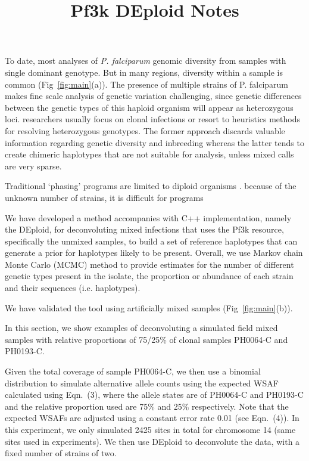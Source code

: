 \documentclass{article}
\title{Pf3k DEploid Notes}
\author{ }
\date{}
\begin{document}
\maketitle

To date, most analyses of {\it P. falciparum} genomic diversity from samples with single dominant genotype.  But in many regions, diversity within a sample is common (Fig~\ref{fig:main}(a)). The presence of multiple strains of P. falciparum makes fine scale
analysis of genetic variation challenging, since genetic differences between
the genetic types of this haploid organism will appear as heterozygous
loci. researchers usually focus on clonal infections or resort
to heuristics methods for resolving heterozygous genotypes. The former
approach discards valuable information regarding genetic diversity and
inbreeding whereas the latter tends to create chimeric haplotypes that are
not suitable for analysis, unless mixed calls are very sparse.


Traditional ‘phasing’ programs are limited to diploid organisms \citep{Browning2007, Howie2009}. because of the unknown number of strains, it is difficult for programs

We have developed a method accompanies with C++ implementation, namely the DEploid, for deconvoluting mixed infections that uses the Pf3k resource, specifically the unmixed samples, to build a set of reference haplotypes that can generate a prior for haplotypes likely to be present. Overall, we use Markov chain Monte Carlo (MCMC) method to provide estimates for the number of different genetic types present in the isolate, the proportion or abundance of each strain and their sequences (i.e. haplotypes).

We have validated the tool using artificially mixed samples \citep{Zhu2017} (Fig~\ref{fig:main}(b)).

In this section, we show examples of deconvoluting a simulated field mixed samples with relative proportions of 75/25\% of clonal samples {\textmd PH0064-C} and {\textmd PH0193-C}.

Given the total coverage of sample {\textmd PH0064-C}, we then use a binomial distribution to simulate alternative allele counts using the expected WSAF calculated using \citet{Zhu2017} Eqn.~(3), where the allele states are of {\textmd PH0064-C} and {\textmd PH0193-C} and the relative proportion used are 75\% and 25\% respectively. Note that the expected WSAFs are adjusted using a constant error rate 0.01 (see Eqn.~(4)). In this experiment, we only simulated 2425 sites in total for chromosome 14 (same sites used in \citet{Zhu2017} experiments). We then use DEploid to deconvolute the data, with a fixed number of strains of two.
\end{document}

